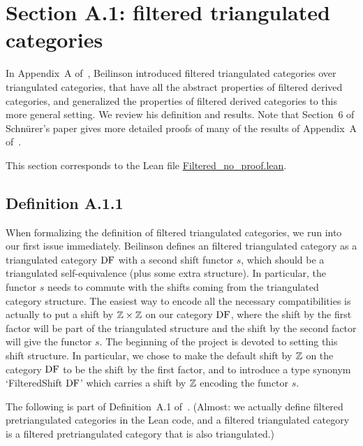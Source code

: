 \chapter{Section A.1: filtered triangulated categories}

In Appendix~A of~\cite{Be1}, Beilinson introduced filtered triangulated 
categories over triangulated categories, that have all the abstract properties of filtered
derived categories, and generalized the properties of filtered derived categories to this more general setting. We review his definition and results.
Note that Section~6 of Schn\"urer's paper \cite{Schnur} gives more detailed proofs of many of the results of Appendix~A of~\cite{Be1}.

This section corresponds to the Lean file \url{Filtered_no_proof.lean}.

\section{Definition A.1.1}

When formalizing the definition of filtered triangulated 
categories, we run into our first issue immediately. Beilinson defines an filtered triangulated category as a triangulated
category $\operatorname{DF}$ with a second shift functor $s$, which should be a triangulated self-equivalence (plus some extra structure). In particular,
the functor $s$ needs to commute with the shifts coming from the triangulated category structure. The easiest way to encode all
the necessary compatibilities is actually to put a shift by $\mathbb{Z} \times \mathbb{Z}$ on our category $\operatorname{DF}$, where the shift by the first factor
will be part of the triangulated structure and the shift by the second factor will give the functor $s$. The beginning of the project
is devoted to setting this shift structure. In particular, we chose to make the default shift by $\mathbb{Z}$ on the  category $\operatorname{DF}$ to be the
shift by the first factor, and to introduce a type synonym `FilteredShift $\operatorname{DF}$' which carries a shift by $\mathbb{Z}$ encoding the functor  $s$.

The following is part of Definition~A.1 of~\cite{Be1}. (Almost: we actually define filtered pretriangulated categories in the Lean code,
and a filtered triangulated category is a filtered pretriangulated category that is also triangulated.)

